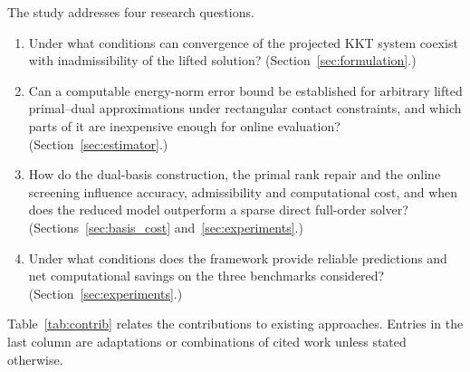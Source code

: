 \documentclass[11pt,a4paper]{article}
\providecommand{\tightlist}{\setlength{\itemsep}{0pt}\setlength{\parskip}{0pt}}
\begin{document}
The study addresses four research questions.
\begin{enumerate}
\tightlist
\item[\textbf{RQ1}] Under what conditions can convergence of the projected KKT system coexist with inadmissibility of the lifted solution? (Section~\ref{sec:formulation}.)
\item[\textbf{RQ2}] Can a computable energy-norm error bound be established for arbitrary lifted primal--dual approximations under rectangular contact constraints, and which parts of it are inexpensive enough for online evaluation? (Section~\ref{sec:estimator}.)
\item[\textbf{RQ3}] How do the dual-basis construction, the primal rank repair and the online screening influence accuracy, admissibility and computational cost, and when does the reduced model outperform a sparse direct full-order solver? (Sections~\ref{sec:basis_cost} and~\ref{sec:experiments}.)
\item[\textbf{RQ4}] Under what conditions does the framework provide reliable predictions and net computational savings on the three benchmarks considered? (Section~\ref{sec:experiments}.)
\end{enumerate}
Table~\ref{tab:contrib} relates the contributions to existing approaches. Entries in the last column are adaptations or combinations of cited work unless stated otherwise.
\end{document}
